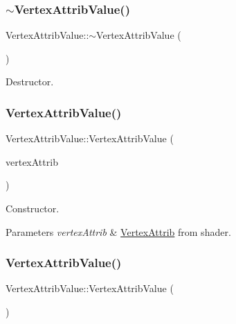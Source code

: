 \subsubsection{\texorpdfstring{$\sim$\+Vertex\+Attrib\+Value()}{~VertexAttribValue()}\hspace{0.1cm}{\footnotesize\ttfamily [1/2]}}
{\footnotesize\ttfamily Vertex\+Attrib\+Value\+::$\sim$\+Vertex\+Attrib\+Value (\begin{DoxyParamCaption}{ }\end{DoxyParamCaption})}

Destructor. \mbox{\label{classVertexAttribValue_adc98209b6f57808f0d96168c5e90bb5d}} 
\subsubsection{\texorpdfstring{Vertex\+Attrib\+Value()}{VertexAttribValue()}\hspace{0.1cm}{\footnotesize\ttfamily [3/4]}}
{\footnotesize\ttfamily Vertex\+Attrib\+Value\+::\+Vertex\+Attrib\+Value (\begin{DoxyParamCaption}\item[{\hyperlink{structVertexAttrib}{Vertex\+Attrib} $\ast$}]{vertex\+Attrib }\end{DoxyParamCaption})}

Constructor. 
\begin{DoxyParams}{Parameters}
{\em vertex\+Attrib} & \hyperlink{structVertexAttrib}{Vertex\+Attrib} from shader. \\
\hline
\end{DoxyParams}
\mbox{\label{classVertexAttribValue_aa2c996c4b7c97e2abd937fd9cd2e8449}} 
\subsubsection{\texorpdfstring{Vertex\+Attrib\+Value()}{VertexAttribValue()}\hspace{0.1cm}{\footnotesize\ttfamily [4/4]}}
{\footnotesize\ttfamily Vertex\+Attrib\+Value\+::\+Vertex\+Attrib\+Value (\begin{DoxyParamCaption}{ }\end{DoxyParamCaption})}

